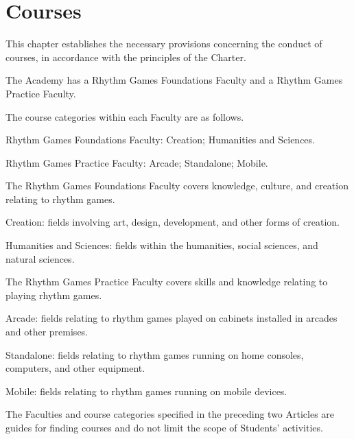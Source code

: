 \newpage
\chapter{Courses}
\begin{articles}
  \item This chapter establishes the necessary provisions concerning the conduct of courses, in accordance with the principles of the Charter.
  \item The Academy has a Rhythm Games Foundations Faculty and a Rhythm Games Practice Faculty.
  \begin{paragraphs}
    \item The course categories within each Faculty are as follows.
  \end{paragraphs}
  \begin{subitems}
    \item Rhythm Games Foundations Faculty: Creation; Humanities and Sciences.
    \item Rhythm Games Practice Faculty: Arcade; Standalone; Mobile.
  \end{subitems}
  \item The Rhythm Games Foundations Faculty covers knowledge, culture, and creation relating to rhythm games.
  \begin{subitems}
    \item Creation: fields involving art, design, development, and other forms of creation.
    \item Humanities and Sciences: fields within the humanities, social sciences, and natural sciences.
  \end{subitems}
  \item The Rhythm Games Practice Faculty covers skills and knowledge relating to playing rhythm games.
  \begin{subitems}
    \item Arcade: fields relating to rhythm games played on cabinets installed in arcades and other premises.
    \item Standalone: fields relating to rhythm games running on home consoles, computers, and other equipment.
    \item Mobile: fields relating to rhythm games running on mobile devices.
  \end{subitems}
  \item The Faculties and course categories specified in the preceding two Articles are guides for finding courses and do not limit the scope of Students' activities.
  \begin{paragraphs}

\end{paragraphs}
\end{articles}
